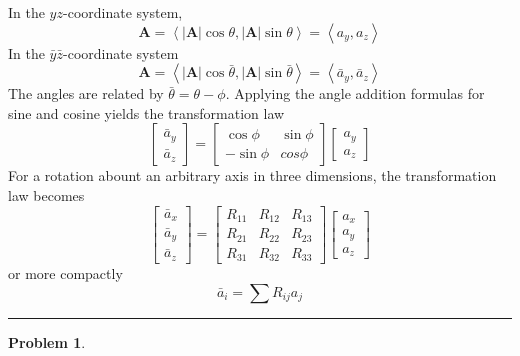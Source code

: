 \documentclass{article}
\theoremstyle{definition}
\newtheorem{problem}{Problem}[section]
\theoremstyle{remark}
\newcommand{\pline}{\par\noindent\rule{\textwidth}{0.5pt}}
\newcommand{\abs}[1]{\left|#1\right|}
\newcommand{\components}[1]{\left\langle #1 \right\rangle}
\renewcommand{\vec}{\mathbf}
\newcommand{\veca}{\vec{A}}
\begin{document}
\noindent In the $yz$-coordinate system, \[\veca = \components{\abs{\veca}\cos\theta,\abs{\veca}\sin\theta} = \components{a_{y},a_{z}}\] In the $\bar{y}\bar{z}$-coordinate system \[\veca = \components{\abs{\veca}\cos\bar{\theta},\abs{\veca}\sin\bar{\theta}} = \components{\bar{a}_y,\bar{a}_z}\] The angles are related by $\bar{\theta} = \theta-\phi$. Applying the angle addition formulas for sine and cosine yields the transformation law
\begin{equation}
\begin{bmatrix}
\bar{a}_y \\ \bar{a}_z
\end{bmatrix}
=\begin{bmatrix}
\cos\phi & \sin\phi \\ -\sin\phi & cos\phi
\end{bmatrix}
\begin{bmatrix}
a_y \\ a_z
\end{bmatrix}
\end{equation}
For a rotation abount an arbitrary axis in three dimensions, the transformation law becomes
\begin{equation}
\begin{bmatrix}
\bar{a}_x \\ \bar{a}_y \\ \bar{a}_z
\end{bmatrix}
=\begin{bmatrix}
R_{11} & R_{12} & R_{13}\\R_{21} & R_{22} & R_{23}\\R_{31} & R_{32} & R_{33}
\end{bmatrix}
\begin{bmatrix}
a_x \\ a_y \\ a_z
\end{bmatrix}
\end{equation}
or more compactly
\begin{equation}
\bar{a}_i = \sum R_{ij}a_j
\end{equation}
\pline
\begin{problem} 
\end{problem}
\end{document}
